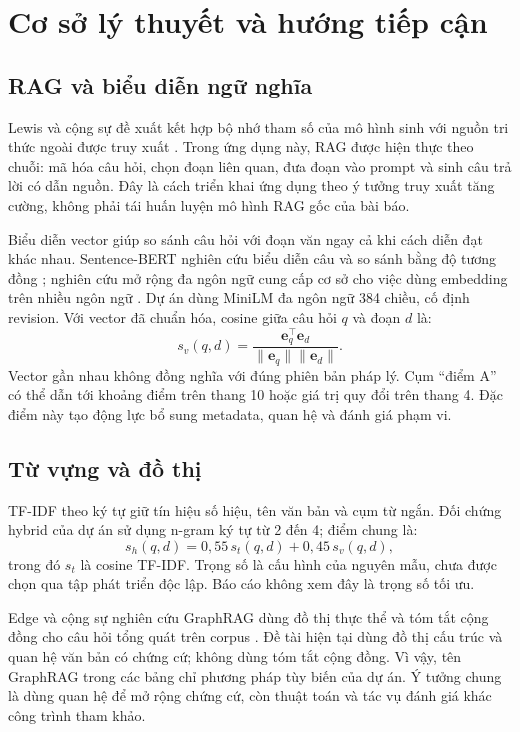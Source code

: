 \section{Cơ sở lý thuyết và hướng tiếp cận}
\subsection{RAG và biểu diễn ngữ nghĩa}
Lewis và cộng sự đề xuất kết hợp bộ nhớ tham số của mô hình sinh với nguồn tri thức ngoài được truy xuất \cite{lewis}. Trong ứng dụng này, RAG được hiện thực theo chuỗi: mã hóa câu hỏi, chọn đoạn liên quan, đưa đoạn vào prompt và sinh câu trả lời có dẫn nguồn. Đây là cách triển khai ứng dụng theo ý tưởng truy xuất tăng cường, không phải tái huấn luyện mô hình RAG gốc của bài báo.

Biểu diễn vector giúp so sánh câu hỏi với đoạn văn ngay cả khi cách diễn đạt khác nhau. Sentence-BERT nghiên cứu biểu diễn câu và so sánh bằng độ tương đồng \cite{sbert}; nghiên cứu mở rộng đa ngôn ngữ cung cấp cơ sở cho việc dùng embedding trên nhiều ngôn ngữ \cite{multilingual}. Dự án dùng MiniLM đa ngôn ngữ 384 chiều, cố định revision. Với vector đã chuẩn hóa, cosine giữa câu hỏi $q$ và đoạn $d$ là:
\begin{equation}
 s_v(q,d)=\frac{\mathbf e_q^\top\mathbf e_d}{\|\mathbf e_q\|\|\mathbf e_d\|}.
\end{equation}
Vector gần nhau không đồng nghĩa với đúng phiên bản pháp lý. Cụm ``điểm A'' có thể dẫn tới khoảng điểm trên thang 10 hoặc giá trị quy đổi trên thang 4. Đặc điểm này tạo động lực bổ sung metadata, quan hệ và đánh giá phạm vi.

\subsection{Từ vựng và đồ thị}
TF-IDF theo ký tự giữ tín hiệu số hiệu, tên văn bản và cụm từ ngắn. Đối chứng hybrid của dự án sử dụng n-gram ký tự từ 2 đến 4; điểm chung là:
\begin{equation}
 s_h(q,d)=0{,}55\,s_t(q,d)+0{,}45\,s_v(q,d),
\end{equation}
trong đó $s_t$ là cosine TF-IDF. Trọng số là cấu hình của nguyên mẫu, chưa được chọn qua tập phát triển độc lập. Báo cáo không xem đây là trọng số tối ưu.

Edge và cộng sự nghiên cứu GraphRAG dùng đồ thị thực thể và tóm tắt cộng đồng cho câu hỏi tổng quát trên corpus \cite{edge}. Đề tài hiện tại dùng đồ thị cấu trúc và quan hệ văn bản có chứng cứ; không dùng tóm tắt cộng đồng. Vì vậy, tên GraphRAG trong các bảng chỉ phương pháp tùy biến của dự án. Ý tưởng chung là dùng quan hệ để mở rộng chứng cứ, còn thuật toán và tác vụ đánh giá khác công trình tham khảo.

